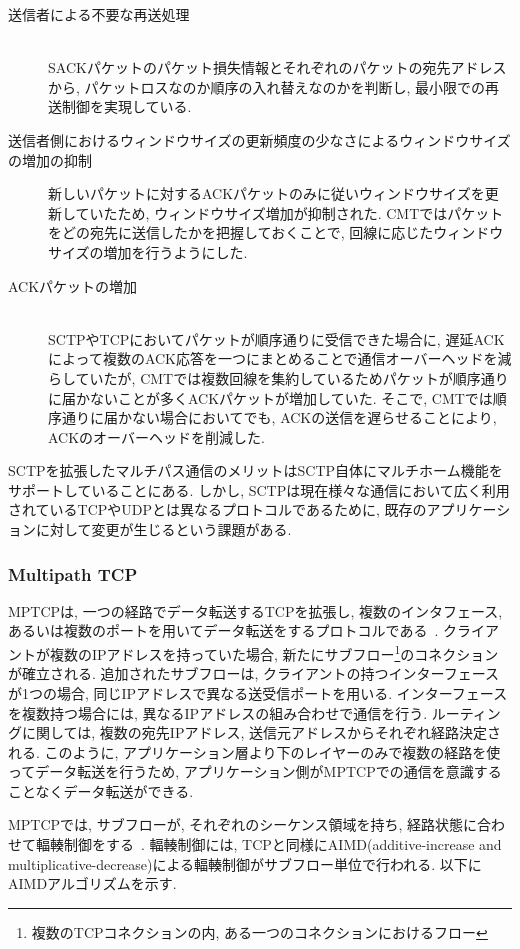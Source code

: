 \begin{description}
 \item[送信者による不要な再送処理]\mbox{}\\ 
        SACKパケットのパケット損失情報とそれぞれのパケットの宛先アドレスから, パケットロスなのか順序の入れ替えなのかを判断し,
        最小限での再送制御を実現している. 
 \item[送信者側におけるウィンドウサイズの更新頻度の少なさによるウィンドウサイズの増加の抑制]\mbox{}
        新しいパケットに対するACKパケットのみに従いウィンドウサイズを更新していたため, ウィンドウサイズ増加が抑制された. 
        CMTではパケットをどの宛先に送信したかを把握しておくことで, 回線に応じたウィンドウサイズの増加を行うようにした. 
 \item[ACKパケットの増加]\mbox{}\\
        SCTPやTCPにおいてパケットが順序通りに受信できた場合に,
        遅延ACKによって複数のACK応答を一つにまとめることで通信オーバーヘッドを減らしていたが,
        CMTでは複数回線を集約しているためパケットが順序通りに届かないことが多くACKパケットが増加していた. 
        そこで, CMTでは順序通りに届かない場合においてでも, ACKの送信を遅らせることにより, ACKのオーバーヘッドを削減した. 
\end{description}
SCTPを拡張したマルチパス通信のメリットはSCTP自体にマルチホーム機能をサポートしていることにある. 
しかし, SCTPは現在様々な通信において広く利用されているTCPやUDPとは異なるプロトコルであるために,
既存のアプリケーションに対して変更が生じるという課題がある. 


\subsubsection{Multipath TCP}
MPTCPは, 一つの経路でデータ転送するTCPを拡張し, 複数のインタフェース,
あるいは複数のポートを用いてデータ転送をするプロトコルである~\cite{mptcp}.
クライアントが複数のIPアドレスを持っていた場合, 新たにサブフロー\footnote{複数のTCPコネクションの内,
ある一つのコネクションにおけるフロー}のコネクションが確立される.
追加されたサブフローは, クライアントの持つインターフェースが1つの場合, 同じIPアドレスで異なる送受信ポートを用いる.
インターフェースを複数持つ場合には, 異なるIPアドレスの組み合わせで通信を行う.
ルーティングに関しては, 複数の宛先IPアドレス, 送信元アドレスからそれぞれ経路決定される.
このように, アプリケーション層より下のレイヤーのみで複数の経路を使ってデータ転送を行うため,
アプリケーション側がMPTCPでの通信を意識することなくデータ転送ができる.

MPTCPでは, サブフローが, それぞれのシーケンス領域を持ち, 経路状態に合わせて輻輳制御をする~\cite{cong}.
輻輳制御には, TCPと同様にAIMD(additive-increase and
multiplicative-decrease)による輻輳制御がサブフロー単位で行われる.
以下にAIMDアルゴリズムを示す.

